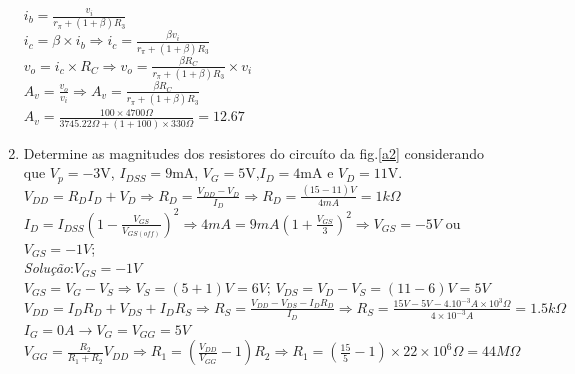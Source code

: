 \documentclass[11pt,a4paper,twoside]{report}
\begin{document}
\begin{enumerate}
\begin{minipage}[c]{8cm}
{$i_b=\frac{v_i}{r_{\pi}+(1+\beta)R_3}$\\

$i_c=\beta \times i_b\Longrightarrow i_c=\frac{\beta v_i}{r_{\pi}+(1+\beta)R_3}$\\

$v_o=i_c\times R_C\Longrightarrow v_o=\frac{\beta R_C }{r_{\pi}+(1+\beta)R_3}\times v_i$\\

$A_v=\frac{v_o}{v_i}\Longrightarrow A_v=\frac{\beta R_C }{r_{\pi}+(1+\beta)R_3}$\\

$ A_v=\frac{100\times4700\Omega}{3745.22\Omega+(1+100)\times 330\Omega}=12.67$\\
}
\end{minipage}

\item Determine as magnitudes dos resistores do circu\'ito da fig.\ref{a2} considerando que $V_p=-3$V, $I_{DSS}=9$mA, $V_G=5$V,$I_D=4$mA e $V_D=11$V.\\

{$V_{DD}=R_DI_D+V_D\Longrightarrow R_D=\frac{V_{DD}-V_D}{I_D}\Longrightarrow R_D=\frac{(15-11)V}{4mA}=1k\Omega$\\

$I_D=I_{DSS}\left( 1-\frac{V_{GS}}{V_{GS (off)}}\right) ^2\Longrightarrow 4mA=9mA\left( 1+\frac{V_{GS}}{3}\right) ^2\Longrightarrow V_{GS}=-5V$ ou $ V_{GS}=-1V$; \\

 \textit{Solu\c c\~ao}:$V_{GS}=-1V$\\

$V_{GS}=V_G-V_S\Longrightarrow V_S= (5+1)V= 6V$;  $V_{DS}=V_D-V_S=(11-6)V=5V$\\

$V_{DD}=I_DR_D+V_{DS}+I_DR_S\Longrightarrow R_S=\frac{V_{DD}-V_{DS}-I_DR_D}{I_D}\Longrightarrow R_S=\frac{15V-5V-4.10^{-3}A\times10^3\Omega}{4\times10^{-3}A}=1.5k\Omega$\\

$I_G=0A \longrightarrow V_G=V_{GG}=5V$\\
$V_{GG}=\frac{R_2}{R_1+R_2}V_{DD}\Longrightarrow R_1=\left( \frac{V_{DD}}{V_{GG}}-1\right)R_2 \Longrightarrow R_1=\left( \frac{15}{5}-1\right) \times 22\times 10^6 \Omega=44M\Omega $
}


\end{enumerate}
\end{document}
